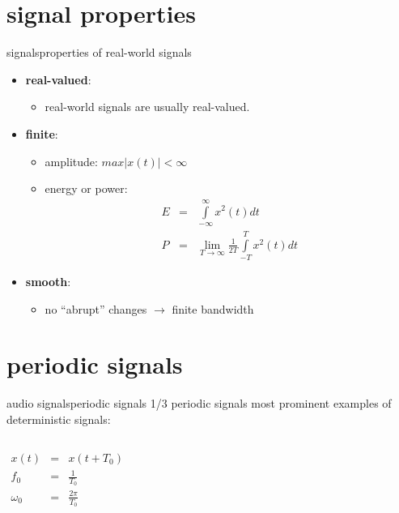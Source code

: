     \section[properties]{signal properties}
        \begin{frame}{signals}{properties of real-world signals}
            \begin{itemize}
                \item   \textbf{real-valued}:
                    \begin{itemize}
                        \item   real-world signals are usually real-valued.
                    \end{itemize}
                \item<2->   \textbf{finite}:
                    \begin{itemize}
                        \item   amplitude: $max|x(t)|<\infty$ 
                        \item<3->   energy or power:
                            \begin{eqnarray*}
                                E &=& \int\limits_{-\infty}^{\infty}{x^2(t) dt}\\
                                P &=& \lim_{T \rightarrow \infty}\frac{1}{2T}\int\limits_{-T}^{T}{x^2(t) dt}
                            \end{eqnarray*}
                    \end{itemize}
                \item<4->   \textbf{smooth}:
                    \begin{itemize}
                        \item  no ``abrupt'' changes $\rightarrow$ finite bandwidth 
                    \end{itemize}
            \end{itemize}
        \end{frame}
\section{periodic signals}
\begin{frame}{audio signals}{periodic signals 1/3}
	\vspace{-3mm}
    periodic signals most prominent examples of deterministic signals: 
    \begin{columns}
        \begin{eqnarray}
            x(t) 	&=& x(t+T_0)\nonumber\\
            f_0 	&=& \frac{1}{T_0}\nonumber\\
            \omega_0&=& \frac{2\pi}{T_0}\nonumber
        \end{eqnarray}
	
    \end{columns}
\end{frame}

